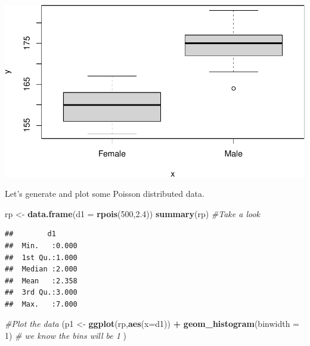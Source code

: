 \documentclass[
  a4paperpaper,
]{book}
\newenvironment{Shaded}{\begin{snugshade}}{\end{snugshade}}
\newcommand{\CommentTok}[1]{\textcolor[rgb]{0.56,0.35,0.01}{\textit{#1}}}
\newcommand{\DataTypeTok}[1]{\textcolor[rgb]{0.13,0.29,0.53}{#1}}
\newcommand{\DecValTok}[1]{\textcolor[rgb]{0.00,0.00,0.81}{#1}}
\newcommand{\FloatTok}[1]{\textcolor[rgb]{0.00,0.00,0.81}{#1}}
\newcommand{\KeywordTok}[1]{\textcolor[rgb]{0.13,0.29,0.53}{\textbf{#1}}}
\newcommand{\NormalTok}[1]{#1}
\newcommand{\OperatorTok}[1]{\textcolor[rgb]{0.81,0.36,0.00}{\textbf{#1}}}
\newcommand{\StringTok}[1]{\textcolor[rgb]{0.31,0.60,0.02}{#1}}
\begin{document}
\begin{center}\includegraphics{BB852_files/figure-latex/unnamed-chunk-100-1} \end{center}

Let's generate and plot some Poisson distributed data.

\begin{Shaded}
\begin{Highlighting}[]
\NormalTok{rp \textless{}{-}}\StringTok{ }\KeywordTok{data.frame}\NormalTok{(}\DataTypeTok{d1 =} \KeywordTok{rpois}\NormalTok{(}\DecValTok{500}\NormalTok{,}\FloatTok{2.4}\NormalTok{))}
\KeywordTok{summary}\NormalTok{(rp) }\CommentTok{\#Take a look}
\end{Highlighting}
\end{Shaded}

\begin{verbatim}
##        d1       
##  Min.   :0.000  
##  1st Qu.:1.000  
##  Median :2.000  
##  Mean   :2.358  
##  3rd Qu.:3.000  
##  Max.   :7.000
\end{verbatim}

\begin{Shaded}
\begin{Highlighting}[]
\CommentTok{\#Plot the data}
\NormalTok{(p1 \textless{}{-}}\StringTok{ }\KeywordTok{ggplot}\NormalTok{(rp,}\KeywordTok{aes}\NormalTok{(}\DataTypeTok{x=}\NormalTok{d1)) }\OperatorTok{+}\StringTok{ }
\StringTok{  }\KeywordTok{geom\_histogram}\NormalTok{(}\DataTypeTok{binwidth =} \DecValTok{1}\NormalTok{) }\CommentTok{\# we know the bins will be 1}
\NormalTok{  )}
\end{Highlighting}
\end{Shaded}
\end{document}
